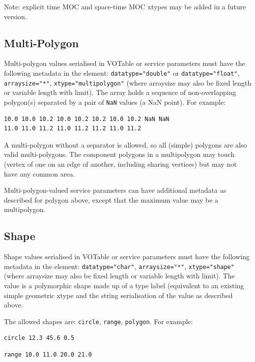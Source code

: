 \documentclass[11pt,letter]{ivoa}
\begin{document}
Note: explicit time MOC and space-time MOC xtypes may be added in a future version.

\subsection{Multi-Polygon}
Multi-polygon values serialised in VOTable or service parameters must have the
following metadata in the  element:  \verb|datatype="double"| or \verb|datatype="float"|,
\verb|arraysize="*"|, \verb|xtype="multipolygon"|
(where arraysize may also be fixed length or variable length with limit).
The array holds a sequence of non-overlapping polygon(s) separated by a pair of \verb|NaN| values
(a NaN point). For example:

\begin{verbatim}
10.0 10.0 10.2 10.0 10.2 10.2 10.0 10.2 NaN NaN
11.0 11.0 11.2 11.0 11.2 11.2 11.0 11.2
\end{verbatim}

A multi-polygon without a separator is allowed, so all (simple) polygons are also valid multi-polygons. The
component polygons in a multipolygon may touch (vertex of one on an edge of another, including sharing vertices)
but may not have any common area.

Multi-polygon-valued service parameters can have additional metadata as described
for polygon above, except that the maximum value may be a multipolygon.

\subsection{Shape}
Shape values serialised in VOTable or service parameters must have the following metadata in the
 element: \verb|datatype="char"|, \verb|arraysize="*"|, \verb|xtype="shape"|
(where arraysize may also be fixed length or variable length with limit).
The value is a polymorphic shape made up of a type label (equivalent to an existing simple
geometric xtype and the string serialisation of the value as described above.

The allowed shapes are: \verb|circle|, \verb|range|, \verb|polygon|. For example:

\begin{verbatim}
circle 12.3 45.6 0.5
\end{verbatim}

\begin{verbatim}
range 10.0 11.0 20.0 21.0
\end{verbatim}
\end{document}

